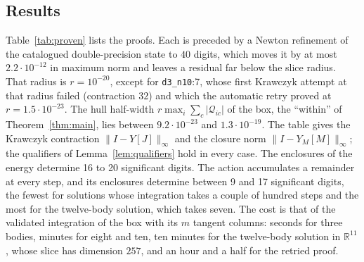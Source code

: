 \documentclass[11pt]{amsart}
\theoremstyle{definition}
\newcommand{\R}{\mathbb{R}}
\newcommand{\intv}[1]{[#1]}
\begin{document}
\subsection{Results}
Table~\ref{tab:proven} lists the proofs. Each is preceded by a Newton refinement of the catalogued double-precision state to $40$ digits, which moves it by at most $2.2\cdot10^{-12}$ in maximum norm and leaves a residual far below the slice radius. That radius is $r=10^{-20}$, except for \texttt{d3\_n10}:7, whose first Krawczyk attempt at that radius failed (contraction $32$) and which the automatic retry proved at $r=1.5\cdot10^{-23}$. The hull half-width $r\max_i\sum_c|\mathcal Q_{ic}|$ of the box, the ``within'' of Theorem~\ref{thm:main}, lies between $9.2\cdot10^{-23}$ and $1.3\cdot10^{-19}$. The table gives the Krawczyk contraction $\|I-Y\intv{J}\|_\infty$ and the closure norm $\|I-Y_M\intv{M}\|_\infty$; the qualifiers of Lemma~\ref{lem:qualifiers} hold in every case. The enclosures of the energy determine 16 to 20 significant digits. The action accumulates a remainder at every step, and its enclosures determine between 9 and 17 significant digits, the fewest for solutions whose integration takes a couple of hundred steps and the most for the twelve-body solution, which takes seven. The cost is that of the validated integration of the box with its $m$ tangent columns: seconds for three bodies, minutes for eight and ten, ten minutes for the twelve-body solution in $\R^{11}$, whose slice has dimension $257$, and an hour and a half for the retried proof.
\end{document}
